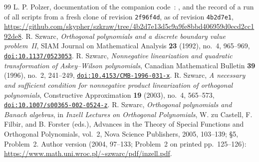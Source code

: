 \begin{thebibliography}{99}
 L. P. Polzer, documentation of the companion code~\cite{code}: ,  and the record  of a run of all scripts from a fresh clone of revision \texttt{2f96f4d}, as of revision \texttt{4b2d7e1}, \url{https://github.com/skypher/szkraw/tree/4b2d7e13d5c9a9fe8bbd406959d0ecd2cc192de8}.
 R. Szwarc, \emph{Orthogonal polynomials and a discrete boundary value problem~II}, SIAM Journal on Mathematical Analysis \textbf{23} (1992), no.~4, 965--969, \href{https://doi.org/10.1137/0523053}{\nolinkurl{doi:10.1137/0523053}}.
 R. Szwarc, \emph{Nonnegative linearization and quadratic transformation of Askey--Wilson polynomials}, Canadian Mathematical Bulletin \textbf{39} (1996), no.~2, 241--249, \href{https://doi.org/10.4153/CMB-1996-031-x}{\nolinkurl{doi:10.4153/CMB-1996-031-x}}.
 R. Szwarc, \emph{A necessary and sufficient condition for nonnegative product linearization of orthogonal polynomials}, Constructive Approximation \textbf{19} (2003), no.~4, 565--573, \href{https://doi.org/10.1007/s00365-002-0524-z}{\nolinkurl{doi:10.1007/s00365-002-0524-z}}.
 R. Szwarc, \emph{Orthogonal polynomials and Banach algebras}, in \emph{Inzell Lectures on Orthogonal Polynomials}, W. zu Castell, F. Filbir, and B. Forster (eds.), Advances in the Theory of Special Functions and Orthogonal Polynomials, vol.~2, Nova Science Publishers, 2005, 103--139; \S5, Problem~2. Author version (2004, 97--133; Problem~2 on printed pp.~125--126): \url{https://www.math.uni.wroc.pl/~szwarc/pdf/inzell.pdf}.
\end{thebibliography}

